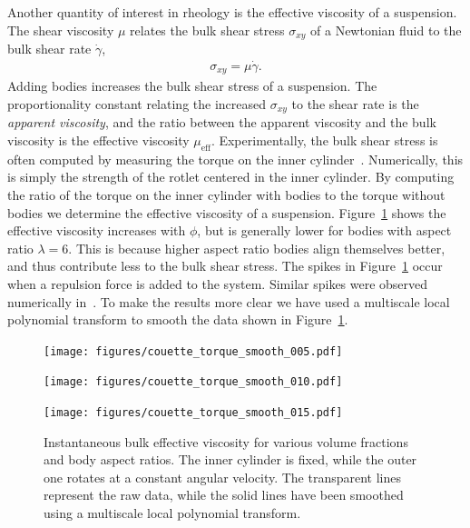 \documentclass[AMA,STIX1COL]{WileyNJD-v2}
\begin{document}
Another quantity of interest in rheology is the effective viscosity of a
suspension. The shear viscosity $\mu$ relates the bulk shear stress
$\sigma_{xy}$ of a Newtonian fluid to the bulk shear rate
$\dot{\gamma}$, 
\begin{align*}
  \sigma_{xy} = \mu\dot{\gamma}.
\end{align*}
Adding bodies increases the bulk shear stress of a suspension.  The
proportionality constant relating the increased $\sigma_{xy}$ to the
shear rate is the {\em apparent viscosity}, and the ratio between the
apparent viscosity and the bulk viscosity is the effective viscosity
$\mu_{\text{eff}}$.  Experimentally, the bulk shear stress is often
computed by measuring the torque on the inner cylinder~\cite{Koos2012}.
Numerically, this is simply the strength of the rotlet centered in the
inner cylinder.  By computing the ratio of the torque on the inner
cylinder with bodies to the torque without bodies we determine the
effective viscosity of a suspension.  Figure~\ref{fig:torque} shows the
effective viscosity increases with $\phi$, but is generally lower for
bodies with aspect ratio $\lambda=6$. This is because higher aspect
ratio bodies align themselves better, and thus contribute less to the
bulk shear stress. The spikes in Figure~\ref{fig:torque} occur when a
repulsion force is added to the system. Similar spikes were observed
numerically in~\cite{Lu2017}. To make the results more clear we have
used a multiscale local polynomial transform to smooth the data shown in
Figure~\ref{fig:torque}.
\begin{figure}[t]
  \centerline{\texttt{[image: figures/couette\_torque\_smooth\_005.pdf]}} 
  \centerline{\texttt{[image: figures/couette\_torque\_smooth\_010.pdf]}}
  \centerline{\texttt{[image: figures/couette\_torque\_smooth\_015.pdf]}}
\caption{Instantaneous bulk effective viscosity for various volume
fractions and body aspect ratios. The inner cylinder is fixed, while the
outer one rotates at a constant angular velocity. The transparent lines
represent the raw data, while the solid lines have been smoothed using a
multiscale local polynomial transform.}\label{fig:torque}
\end{figure} 
\end{document}
